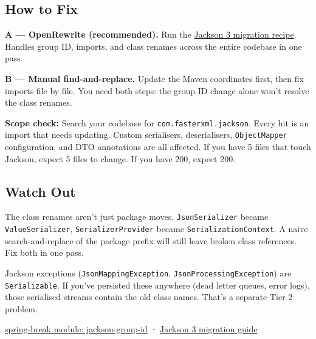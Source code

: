 \documentclass[
  8pt,
  6in, 9inpaper,
]{article}
\begin{document}
\subsection{How to Fix}\label{how-to-fix}

\textbf{A --- OpenRewrite (recommended).} Run the
\href{https://docs.openrewrite.org/recipes/java/jackson/upgradejackson_2_3_typechanges}{Jackson
3 migration recipe}. Handles group ID, imports, and class renames across
the entire codebase in one pass.

\textbf{B --- Manual find-and-replace.} Update the Maven coordinates
first, then fix imports file by file. You need both steps: the group ID
change alone won't resolve the class renames.

\textbf{Scope check:} Search your codebase for
\texttt{com.fasterxml.jackson}. Every hit is an import that needs
updating. Custom serialisers, deserialisers, \texttt{ObjectMapper}
configuration, and DTO annotations are all affected. If you have 5 files
that touch Jackson, expect 5 files to change. If you have 200, expect
200.

\subsection{Watch Out}\label{watch-out}

The class renames aren't just package moves. \texttt{JsonSerializer}
became \texttt{ValueSerializer}, \texttt{SerializerProvider} became
\texttt{SerializationContext}. A naive search-and-replace of the package
prefix will still leave broken class references. Fix both in one pass.

Jackson exceptions (\texttt{JsonMappingException},
\texttt{JsonProcessingException}) are \texttt{Serializable}. If you've
persisted these anywhere (dead letter queues, error logs), those
serialised streams contain the old class names. That's a separate Tier 2
problem.

\href{https://github.com/spoole167/spring-break/tree/main/jackson-group-id}{spring-break
module: jackson-group-id} ·
\href{https://github.com/FasterXML/jackson/blob/main/jackson3/MIGRATING_TO_JACKSON_3.md}{Jackson
3 migration guide}
\end{document}
